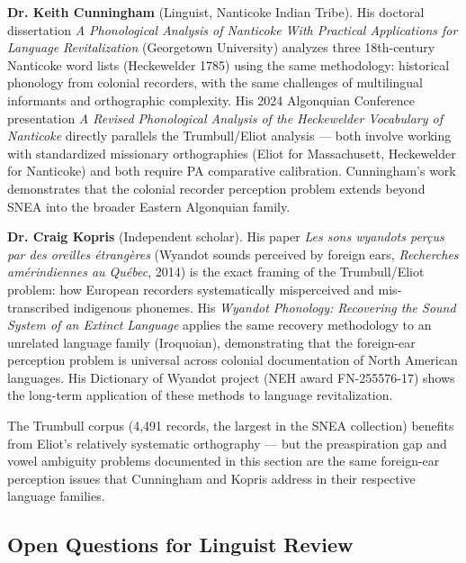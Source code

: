 \textbf{Dr. Keith Cunningham} (Linguist, Nanticoke Indian Tribe). His doctoral
dissertation \emph{A Phonological Analysis of Nanticoke With Practical
Applications for Language Revitalization} (Georgetown University) analyzes
three 18th-century Nanticoke word lists (Heckewelder 1785) using the same
methodology: historical phonology from colonial recorders, with the same
challenges of multilingual informants and orthographic complexity. His 2024
Algonquian Conference presentation \emph{A Revised Phonological Analysis of
the Heckewelder Vocabulary of Nanticoke} directly parallels the Trumbull/Eliot
analysis --- both involve working with standardized missionary orthographies
(Eliot for Massachusett, Heckewelder for Nanticoke) and both require PA
comparative calibration. Cunningham's work demonstrates that the colonial
recorder perception problem extends beyond SNEA into the broader Eastern
Algonquian family.

\textbf{Dr. Craig Kopris} (Independent scholar). His paper \emph{Les sons
wyandots perçus par des oreilles étrangères} (Wyandot sounds perceived by
foreign ears, \emph{Recherches amérindiennes au Québec}, 2014) is the exact
framing of the Trumbull/Eliot problem: how European recorders systematically
misperceived and mis-transcribed indigenous phonemes. His \emph{Wyandot
Phonology: Recovering the Sound System of an Extinct Language} applies the
same recovery methodology to an unrelated language family (Iroquoian),
demonstrating that the foreign-ear perception problem is universal across
colonial documentation of North American languages. His Dictionary of Wyandot
project (NEH award FN-255576-17) shows the long-term application of these
methods to language revitalization.

The Trumbull corpus (4,491 records, the largest in the SNEA collection)
benefits from Eliot's relatively systematic orthography --- but the
preaspiration gap and vowel ambiguity problems documented in this section are
the same foreign-ear perception issues that Cunningham and Kopris address in
their respective language families.

\subsection{Open Questions for Linguist Review}

